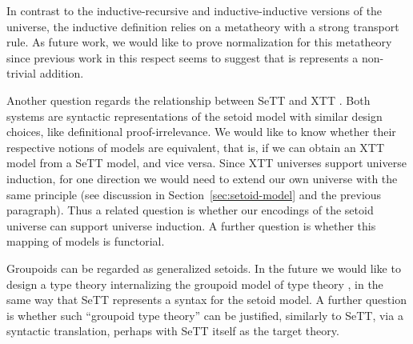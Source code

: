 \documentclass[autoref]{llncs}
\begin{document}
In contrast to the inductive-recursive and inductive-inductive
versions of the universe, the inductive definition relies on a
metatheory with a strong transport rule. As future work, we would like
to prove normalization for this metatheory since previous work in
this respect \cite{abel2019failure} seems to suggest that is
represents a non-trivial addition.

Another question regards the relationship between SeTT \cite{mpc19} and XTT
\cite{xtt}. Both systems are syntactic representations of the setoid model with
similar design choices, like definitional proof-irrelevance. We would like to
know whether their respective notions of models are equivalent, that is, if we
can obtain an XTT model from a SeTT model, and vice versa. Since XTT universes
support universe induction, for one direction we would need to extend our own
universe with the same principle (see discussion in
Section~\ref{sec:setoid-model} and the previous paragraph). Thus a related
question is whether our encodings of the setoid universe can support universe
induction. A further question is whether this mapping of models is functorial.

Groupoids can be regarded as generalized setoids. In the future we would like to
design a type theory internalizing the groupoid model of type theory
\cite{groupoid}, in the same way that SeTT represents a syntax for the setoid
model. A further question is whether such ``groupoid type theory'' can be
justified, similarly to SeTT, via a syntactic translation, perhaps with SeTT
itself as the target theory.


\end{document}
